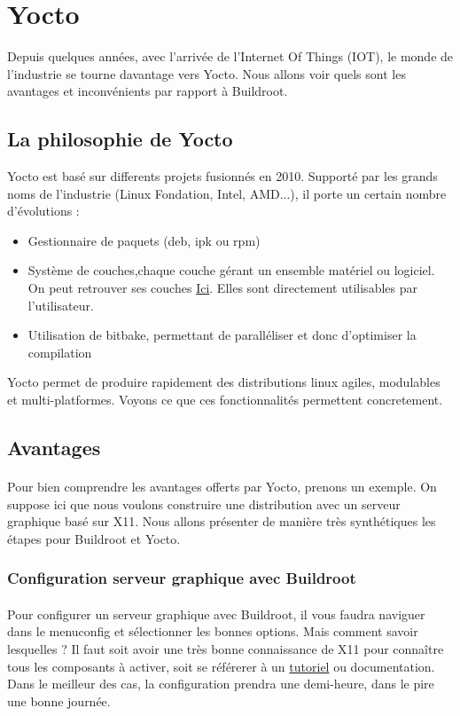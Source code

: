 \section{Yocto}
Depuis quelques années, avec l'arrivée de l'Internet Of Things (IOT), le monde de l'industrie se tourne davantage vers Yocto. Nous allons voir quels sont les avantages et inconvénients par rapport à Buildroot.
\subsection{La philosophie de Yocto}
Yocto est basé sur differents projets fusionnés en 2010. Supporté par les grands noms de l'industrie (Linux Fondation, Intel, AMD...), il porte un certain nombre d'évolutions :

\begin{itemize}
\item Gestionnaire de paquets (deb, ipk ou rpm)
\item Système de couches,chaque couche gérant un ensemble matériel ou logiciel. On peut retrouver ses couches \href{https://layers.openembedded.org}{\color{blue}Ici}. Elles sont directement utilisables par l'utilisateur.
\item Utilisation de bitbake, permettant de paralléliser et donc d'optimiser la compilation
\end{itemize}

Yocto permet de produire rapidement des distributions linux agiles, modulables et multi-platformes. Voyons ce que ces fonctionnalités permettent concretement.  

\subsection{Avantages}

\paragraph{}
Pour bien comprendre les avantages offerts par Yocto, prenons un exemple. On suppose ici que nous voulons construire une distribution avec un serveur graphique basé sur X11. Nous allons présenter de manière très synthétiques les étapes pour Buildroot et Yocto. 
\subsubsection{Configuration serveur graphique avec Buildroot}
\paragraph{}
Pour configurer un serveur graphique avec Buildroot, il vous faudra naviguer dans le menuconfig et sélectionner les bonnes options. Mais comment savoir lesquelles ? Il faut soit avoir une très bonne connaissance de X11 pour connaître tous les composants à activer, soit se référerer à un \href{https://agentoss.wordpress.com/2011/03/06/building-a-tiny-x-org-linux-system-using-buildroot/}{\color{blue}tutoriel} ou documentation. Dans le meilleur des cas, la configuration prendra une demi-heure, dans le pire une bonne journée. 

